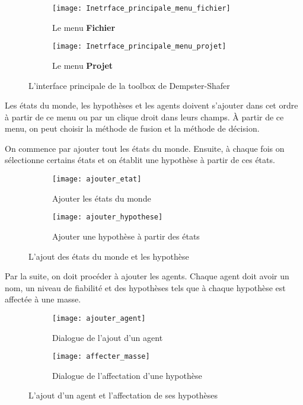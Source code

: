 \begin{figure}[H]
\begin{subfigure}{0.49\textwidth}
\texttt{[image: Inetrface\_principale\_menu\_fichier]}
\caption{Le menu \textbf{Fichier}}
\end{subfigure}
\hfill
\begin{subfigure}{0.49\textwidth}
\texttt{[image: Inetrface\_principale\_menu\_projet]}
\caption{Le menu \textbf{Projet}}
\end{subfigure}
\caption{L'interface principale de la toolbox de Dempster-Shafer}
\end{figure}

Les états du monde, les hypothèses et les agents doivent s'ajouter dans cet ordre à partir
de ce menu ou par un clique droit dans leurs champs. \`A partir de ce menu, on peut choisir la
méthode de fusion et la méthode de décision.

On commence par ajouter tout les états du monde. Ensuite, à chaque fois on sélectionne certains
états et on établit une hypothèse à partir de ces états.

\begin{figure}[H]
\begin{subfigure}{0.49\textwidth}
\texttt{[image: ajouter\_etat]}
\caption{Ajouter les états du monde}
\end{subfigure}
\hfill
\begin{subfigure}{0.49\textwidth}
\texttt{[image: ajouter\_hypothese]}
\caption{Ajouter une hypothèse à partir des états}
\end{subfigure}
\caption{L'ajout des états du monde et les hypothèse}
\end{figure}

Par la suite, on doit procéder à ajouter les agents. Chaque agent doit avoir un nom, un niveau de
fiabilité et des hypothèses tels que à chaque hypothèse est affectée à une masse.

\begin{figure}[H]
\begin{subfigure}{0.49\textwidth}
\texttt{[image: ajouter\_agent]}
\caption{Dialogue de l'ajout d'un agent}
\end{subfigure}
\hfill
\begin{subfigure}{0.49\textwidth}
\texttt{[image: affecter\_masse]}
\caption{Dialogue de l'affectation d'une hypothèse}
\end{subfigure}
\caption{L'ajout d'un agent et l'affectation de ses hypothèses}
\end{figure}

